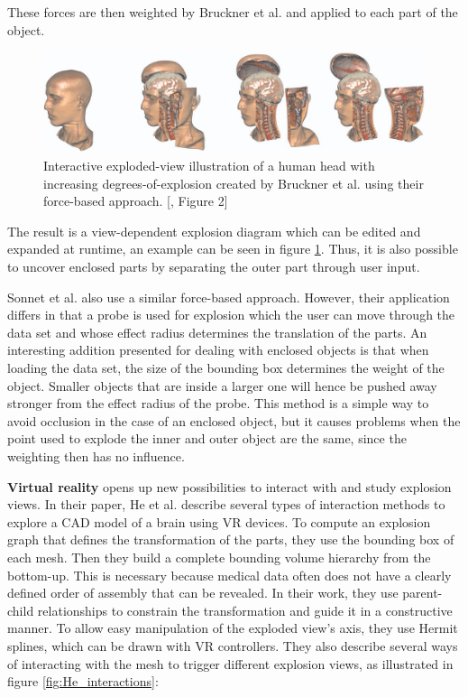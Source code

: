 These forces are then weighted by Bruckner et al. and applied to each part of the object.
\begin{figure}[t]
	\centering
	\includegraphics[width=.95\linewidth]{fig/Images/Bruckner_fig2}
	\caption[]{Interactive exploded-view illustration of a human head with increasing degrees-of-explosion created by Bruckner et al. using their force-based approach. [\cite{Bruckner_2006}, Figure 2]}
	\label{fig:bruckner}
\end{figure}
The result is a view-dependent explosion diagram which can be edited and expanded at runtime, an example can be seen in figure \ref{fig:bruckner}. 
Thus, it is also possible to uncover enclosed parts by separating the outer part through user input.\cite{Bruckner_2006}

Sonnet et al. also use a similar force-based approach.
However, their application differs in that a probe is used for explosion which the user can move through the data set and whose effect radius determines the translation of the parts.\cite{Sonnet_2004}
An interesting addition presented for dealing with enclosed objects is that when loading the data set, the size of the bounding box determines the weight of the object. 
Smaller objects that are inside a larger one will hence be pushed away stronger from the effect radius of the probe. 
This method is a simple way to avoid occlusion in the case of an enclosed object, but it causes problems when the point used to explode the inner and outer object are the same, since the weighting then has no influence.

\textbf{Virtual reality} opens up new possibilities to interact with and study explosion views. In their paper, He et al. describe several types of interaction methods to explore a CAD model of a brain using VR devices.
To compute an explosion graph that defines the transformation of the parts, they use the bounding box of each mesh. Then they build a complete bounding volume hierarchy from the bottom-up.
This is necessary because medical data often does not have a clearly defined order of assembly that can be revealed. 
In their work, they use parent-child relationships to constrain the transformation and guide it in a constructive manner.
To allow easy manipulation of the exploded view's axis, they use Hermit splines, which can be drawn with VR controllers. They also describe several ways of interacting with the mesh to trigger different explosion views, as illustrated in figure \ref{fig:He_interactions}:

